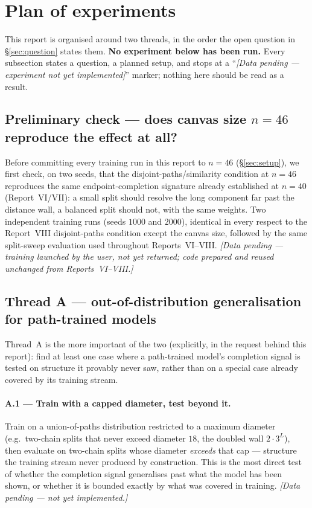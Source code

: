 \documentclass[11pt,a4paper]{article}
\begin{document}
\section{Plan of experiments}
\label{sec:plan}

This report is organised around two threads, in the order the open question in
\S\ref{sec:question} states them. \textbf{No experiment below has been run.} Every subsection
states a question, a planned setup, and stops at a ``\emph{[Data pending --- experiment not yet
implemented]}'' marker; nothing here should be read as a result.

\subsection{Preliminary check --- does canvas size $n=46$ reproduce the effect at all?}
\label{sec:planpre}

Before committing every training run in this report to $n=46$ (\S\ref{sec:setup}), we first
check, on two seeds, that the disjoint-paths/similarity condition at $n=46$ reproduces the same
endpoint-completion signature already established at $n=40$ (Report~VI/VII): a small split
should resolve the long component far past the distance wall, a balanced split should not, with
the same weights. Two independent training runs (seeds $1000$ and $2000$), identical in every
respect to the Report~VIII disjoint-paths condition except the canvas size, followed by the same
split-sweep evaluation used throughout Reports~VI--VIII. \emph{[Data pending --- training
launched by the user, not yet returned; code prepared and reused unchanged from
Reports~VI--VIII.]}

\subsection{Thread A --- out-of-distribution generalisation for path-trained models}
\label{sec:planA}

Thread~A is the more important of the two (explicitly, in the request behind this report): find
at least one case where a path-trained model's completion signal is tested on structure it
provably never saw, rather than on a special case already covered by its training stream.

\paragraph{A.1 --- Train with a capped diameter, test beyond it.} Train on a union-of-paths
distribution restricted to a maximum diameter (e.g.\ two-chain splits that never exceed
diameter $18$, the doubled wall $2\cdot 3^L$), then evaluate on two-chain splits whose diameter
\emph{exceeds} that cap --- structure the training stream never produced by construction. This
is the most direct test of whether the completion signal generalises past what the model has
been shown, or whether it is bounded exactly by what was covered in training.
\emph{[Data pending --- not yet implemented.]}
\end{document}
